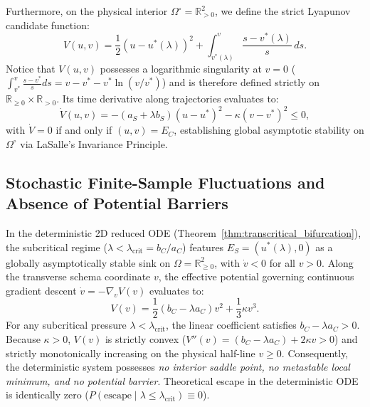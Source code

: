 \documentclass{article}
\theoremstyle{plain}
\theoremstyle{definition}
\begin{document}
Furthermore, on the physical interior $\Omega^\circ = \mathbb{R}_{> 0}^2$, we define the strict Lyapunov candidate function:
\begin{equation}
    V(u, v) = \frac{1}{2} (u - u^*(\lambda))^2 + \int_{v^*(\lambda)}^v \frac{s - v^*(\lambda)}{s} \, ds.
\end{equation}
Notice that $V(u, v)$ possesses a logarithmic singularity at $v = 0$ ($\int_{v^*}^v \frac{s - v^*}{s} ds = v - v^* - v^* \ln(v/v^*)$) and is therefore defined strictly on $\mathbb{R}_{\ge 0} \times \mathbb{R}_{> 0}$. Its time derivative along trajectories evaluates to:
\begin{equation}
    \dot{V}(u, v) = -(a_S + \lambda b_S)(u - u^*)^2 - \kappa (v - v^*)^2 \le 0,
\end{equation}
with $\dot{V} = 0$ if and only if $(u, v) = E_C$, establishing global asymptotic stability on $\Omega^\circ$ via LaSalle's Invariance Principle.
\subsection{Stochastic Finite-Sample Fluctuations and Absence of Potential Barriers}
\label{sec:app_langevin_escape}
In the deterministic 2D reduced ODE (Theorem~\ref{thm:transcritical_bifurcation}), the subcritical regime ($\lambda < \lambda_{\text{crit}} = b_C / a_C$) features $E_S = (u^*(\lambda), 0)$ as a globally asymptotically stable sink on $\Omega = \mathbb{R}_{\ge 0}^2$, with $\dot{v} < 0$ for all $v > 0$. Along the transverse schema coordinate $v$, the effective potential governing continuous gradient descent $\dot{v} = -\nabla_v V(v)$ evaluates to:
\begin{equation}
    V(v) = \frac{1}{2}(b_C - \lambda a_C) v^2 + \frac{1}{3}\kappa v^3.
\end{equation}
For any subcritical pressure $\lambda < \lambda_{\text{crit}}$, the linear coefficient satisfies $b_C - \lambda a_C > 0$. Because $\kappa > 0$, $V(v)$ is strictly convex ($V''(v) = (b_C - \lambda a_C) + 2\kappa v > 0$) and strictly monotonically increasing on the physical half-line $v \ge 0$. Consequently, the deterministic system possesses \emph{no interior saddle point, no metastable local minimum, and no potential barrier}. Theoretical escape in the deterministic ODE is identically zero ($P(\text{escape} \mid \lambda \le \lambda_{\text{crit}}) \equiv 0$).
\end{document}

